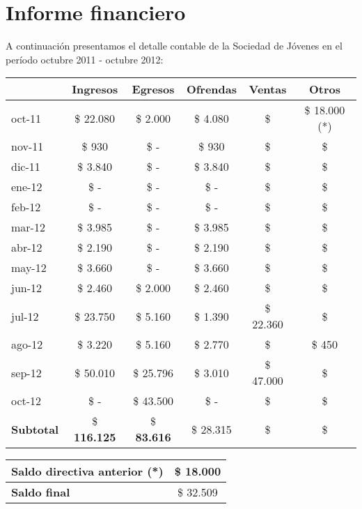\documentclass[12pt,letterpaper]{article}
\begin{document}
\newpage
\section{Informe financiero}
A continuación presentamos el detalle contable de la Sociedad de Jóvenes en el período octubre 2011 - octubre 2012:
\begin{table}[!h]
\centering
\begin{tabular}{|l|c|c||c|c|c|}
\hline
& \textbf{Ingresos} & \textbf{Egresos} & \textbf{Ofrendas} & \textbf{Ventas} & \textbf{Otros}\\ \hline \hline
oct-11 & \$ 22.080 	& \$ 2.000 & \$ 4.080 & \$ & \$ 18.000 (*) \\ \hline
nov-11 & \$ 930 	 &\$ - & \$ 930 & \$ & \$ \\ \hline
dic-11 & \$ 3.840 	 &\$ - & \$ 3.840 & \$ & \$ \\ \hline  
ene-12 & \$ -   	 &\$ -  & \$ - & \$ & \$ \\ \hline
feb-12 & \$ -   	 &\$ -   & \$ - & \$ & \$ \\ \hline
mar-12 & \$ 3.985 	 &\$ - & \$ 3.985 & \$ & \$ \\ \hline  
abr-12 & \$ 2.190 	 &\$ -   & \$ 2.190 & \$ & \$ \\ \hline
may-12 & \$ 3.660 	 &\$ -   & \$ 3.660 & \$ & \$ \\ \hline
jun-12 & \$ 2.460 	 &\$ 2.000 & \$ 2.460 & \$ & \$ \\ \hline
jul-12 & \$ 23.750 	 &\$ 5.160 & \$ 1.390 & \$ 22.360 & \$ \\ \hline
ago-12 & \$ 3.220 	 &\$ 5.160 & \$ 2.770 & \$ & \$ 450 \\ \hline
sep-12 & \$ 50.010 	 &\$ 25.796 & \$ 3.010 & \$ 47.000 & \$ \\ \hline
oct-12 & \$ -   	 &\$ 43.500 & \$ - & \$ & \$ \\ \hline
\textbf{Subtotal} & \$ \textbf{116.125} & \$ \textbf{83.616} & \$ 28.315 & \$ & \$  \\ \hline
\end{tabular}
\end{table}

\begin{table}[!h]
\centering
\begin{tabular}{|l|c|}
\hline
\textbf{Saldo directiva anterior} (*) & \$ 18.000 \\ \hline
\textbf{Saldo final} &  \$ 32.509 \\ \hline
\end{tabular}
\end{table}
\end{document}
